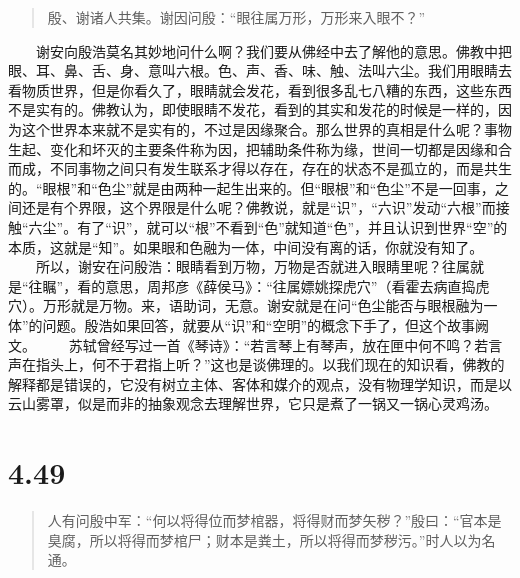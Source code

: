\documentclass[]{book}
\begin{document}
\begin{quote}
殷、谢诸人共集。谢因问殷：``眼往属万形，万形来入眼不？''
\end{quote}

　　谢安向殷浩莫名其妙地问什么啊？我们要从佛经中去了解他的意思。佛教中把眼、耳、鼻、舌、身、意叫六根。色、声、香、味、触、法叫六尘。我们用眼睛去看物质世界，但是你看久了，眼睛就会发花，看到很多乱七八糟的东西，这些东西不是实有的。佛教认为，即使眼睛不发花，看到的其实和发花的时候是一样的，因为这个世界本来就不是实有的，不过是因缘聚合。那么世界的真相是什么呢？事物生起、变化和坏灭的主要条件称为因，把辅助条件称为缘，世间一切都是因缘和合而成，不同事物之间只有发生联系才得以存在，存在的状态不是孤立的，而是共生的。``眼根''和``色尘''就是由两种一起生出来的。但``眼根''和``色尘''不是一回事，之间还是有个界限，这个界限是什么呢？佛教说，就是``识''，``六识''发动``六根''而接触``六尘''。有了``识''，就可以``根''不看到``色''就知道``色''，并且认识到世界``空''的本质，这就是``知''。如果眼和色融为一体，中间没有离的话，你就没有知了。
　　所以，谢安在问殷浩：眼睛看到万物，万物是否就进入眼睛里呢？往属就是``往瞩''，看的意思，周邦彦《薛侯马》：``往属嫖姚探虎穴''（看霍去病直捣虎穴）。万形就是万物。来，语助词，无意。谢安就是在问``色尘能否与眼根融为一体''的问题。殷浩如果回答，就要从``识''和``空明''的概念下手了，但这个故事阙文。
　　苏轼曾经写过一首《琴诗》：``若言琴上有琴声，放在匣中何不鸣？若言声在指头上，何不于君指上听？''这也是谈佛理的。以我们现在的知识看，佛教的解释都是错误的，它没有树立主体、客体和媒介的观点，没有物理学知识，而是以云山雾罩，似是而非的抽象观念去理解世界，它只是煮了一锅又一锅心灵鸡汤。

\section{4.49}\label{section-227}

\begin{quote}
人有问殷中军：``何以将得位而梦棺器，将得财而梦矢秽？''殷曰：``官本是臭腐，所以将得而梦棺尸；财本是粪土，所以将得而梦秽污。''时人以为名通。
\end{quote}
\end{document}
